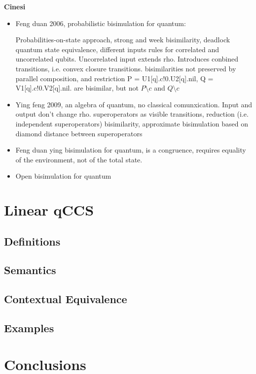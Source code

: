 \documentclass[10pt,a4paper, titlepage]{report}
\newcommand{\note}[1]{{\color{red} #1}}
\begin{document}
\note{\textbf{Cinesi}}
\begin{itemize}
\item Feng duan 2006, probabilistic bisimulation for quantum:

Probabilities-on-state approach, strong and week bisimilarity, deadlock quantum state equivalence, different inputs rules for correlated and uncorrelated qubits. Uncorrelated input extends rho. Introduces conbined transitions, i.e. convex closure transitions. bisimilarities not preserved by parallel composition, and restriction 
P = U1[q].c!0.U2[q].nil, Q = V1[q].c!0.V2[q].nil. are bisimilar, but not $P\setminus c$ and $Q\setminus c$
\item Ying feng 2009, an algebra of quantum, no classical comunxication. Input and output don't change rho. superoperators as visible transitions, reduction (i.e. independent superoperators) bisimilarity, approximate bisimulation based on diamond distance between superoperators

\item Feng duan ying bisimulation for quantum, is a congruence, requires equality of the environment, not of the total state. 
\item Open bisimulation for quantum
\end{itemize}



\chapter{Linear qCCS}

\section{Definitions}


\section{Semantics}



\section{Contextual Equivalence}


\section{Examples}




%
%

\chapter{Conclusions}
\printbibliography[
heading=bibintoc,
title={Bibliography}
]
\end{document}

